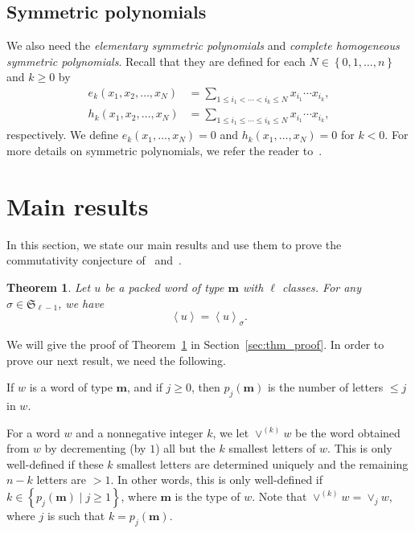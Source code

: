 \documentclass[reqno]{amsart}%
\newcommand{\0}{\phantom{c}}
\let\sumnonlimits\sum
\renewcommand{\sum}{\sumnonlimits\limits}
\newcommand{\defn}[1]{{\color{darkred}\emph{#1}}}
\theoremstyle{plain}
\newtheorem{thm}{Theorem}[section]
\theoremstyle{definition}
\numberwithin{equation}{section}
\begin{document}


\subsection{Symmetric polynomials}

We also need the \defn{elementary symmetric polynomials} and
\defn{complete homogeneous symmetric polynomials}. Recall that they are
defined for each $N \in\left\{  0,1,\ldots,n\right\}  $ and $k \geq0$ by
\begin{align*}
e_{k}(x_{1}, x_{2}, \dotsc, x_{N})  &  = \sum_{1 \leq i_{1} < \cdots< i_{k}
\leq N} x_{i_{1}} \dotsm x_{i_{k}},\\
h_{k}(x_{1}, x_{2}, \dotsc, x_{N})  &  = \sum_{1 \leq i_{1} \leq\cdots\leq
i_{k} \leq N} x_{i_{1}} \dotsm x_{i_{k}},
\end{align*}
respectively. We define $e_{k}(x_{1}, \dotsc, x_{N}) = 0$ and $h_{k}(x_{1},
\dotsc, x_{N}) = 0$ for $k < 0$. For more details on symmetric polynomials, we
refer the reader to~\cite[Ch.~7]{Stanley-EC2}.



\section{Main results}

\label{sec:result}

In this section, we state our main results and use them to prove the
commutativity conjecture of~\cite{AAMP} and~\cite[Conj.~3.10]{AasLin17}.

\begin{thm}
\label{thm:permutation} Let $u$ be a packed word of type $\mathbf{m}$ with
$\ell$ classes. For any $\sigma\in\mathfrak{S}_{\ell-1}$, we have
\[
\left\langle u \right\rangle = \left\langle u \right\rangle _{\sigma}.
\]

\end{thm}

We will give the proof of Theorem~\ref{thm:permutation} in
Section~\ref{sec:thm_proof}. In order to prove our next result, we need the following.

If $w$ is a word of type $\mathbf{m}$, and if $j \geq0$, then $p_{j}%
(\mathbf{m})$ is the number of letters $\leq j$ in $w$.

For a word $w$ and a nonnegative integer $k$, we let \defn{$\vee^{(k)} w$} be
the word obtained from $w$ by decrementing (by $1$) all but the $k$ smallest
letters of $w$. This is only well-defined if these $k$ smallest letters are
determined uniquely and the remaining $n-k$ letters are $> 1$. In other words,
this is only well-defined if $k \in\left\{  p_{j}(\mathbf{m}) \mid j \geq1
\right\}  $, where $\mathbf{m}$ is the type of $w$. Note that $\vee^{(k)} w =
\vee_{j} w$, where $j$ is such that $k = p_{j}(\mathbf{m})$.
\end{document}
